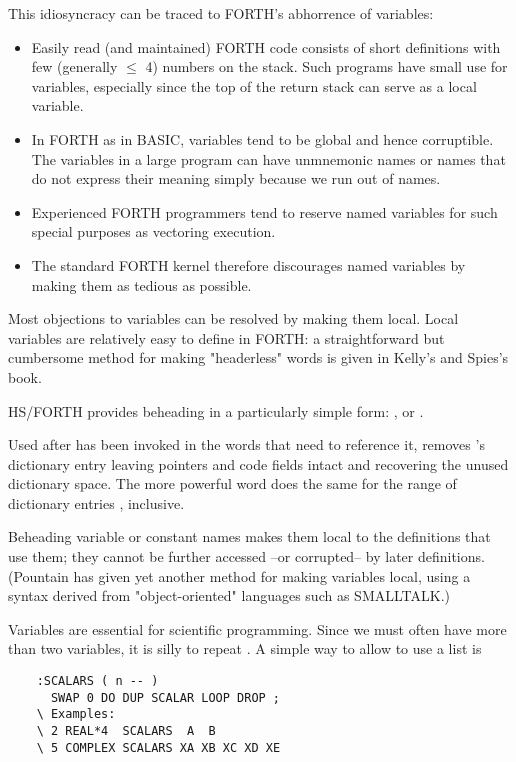 This idiosyncracy can be traced to FORTH's abhorrence of variables:
\begin{itemize}
    \item Easily read (and maintained) FORTH code consists of short definitions with few (generally $\leq$ 4) numbers on the stack. Such programs have small use for variables, especially since the top of the return stack can serve as a local variable.
    \item In FORTH as in BASIC, variables tend to be global and hence corruptible. The variables in a large program can have unmnemonic names or names that do not express their meaning simply because we run out of names.
    \item Experienced FORTH programmers tend to reserve named variables for such special purposes as vectoring execution.
    \item The standard FORTH kernel therefore discourages named variables by making them as tedious as possible.
\end{itemize}

Most objections to variables can be resolved by making them local. Local variables are relatively easy to define in FORTH: a straightforward but cumbersome method for making "headerless" words is given in Kelly's and Spies's book.

HS/FORTH provides beheading in a particularly simple form: , or .

Used after  has been invoked in the words that need to reference it,  removes 's dictionary entry leaving pointers and code fields intact and recovering the unused dictionary space. The more powerful word  does the same for the range of dictionary entries , inclusive.

Beheading variable or constant names makes them local to the definitions that use them; they cannot be further accessed --or corrupted-- by later definitions. (Pountain has given yet another method for making variables local, using a syntax derived from "object-oriented" languages such as SMALLTALK.)

Variables are essential for scientific programming. Since we must often have more than two variables, it is silly to repeat . A simple way to allow  to use a list is

\begin{lstlisting}
    :SCALARS ( n -- )
      SWAP 0 DO DUP SCALAR LOOP DROP ;
    \ Examples:
    \ 2 REAL*4  SCALARS  A  B
    \ 5 COMPLEX SCALARS XA XB XC XD XE
\end{lstlisting}

